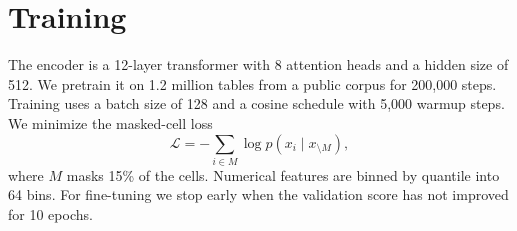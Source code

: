 \section{Training}
\label{sec:training}
The encoder is a 12-layer transformer with 8 attention heads and a hidden size of 512.
We pretrain it on 1.2 million tables from a public corpus \cite{corpus2024} for 200,000 steps.
Training uses a batch size of 128 and a cosine schedule with 5,000 warmup steps.
We minimize the masked-cell loss
\begin{equation}
\mathcal{L} = -\sum_{i \in M} \log p(x_i \mid x_{\setminus M}),
\end{equation}
where $M$ masks 15\% of the cells.
Numerical features are binned by quantile into 64 bins.
For fine-tuning we stop early when the validation score has not improved for 10 epochs.
